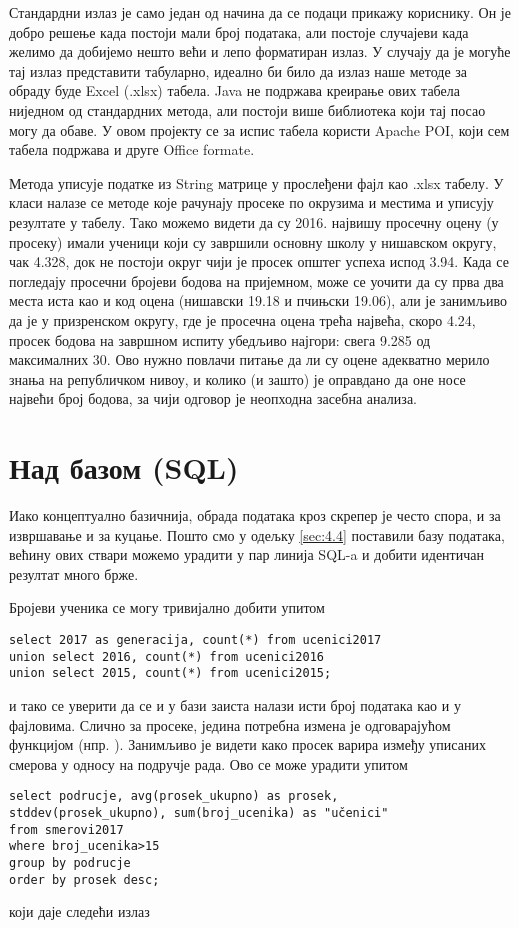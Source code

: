 Стандардни излаз је само један од начина да се подаци прикажу кориснику. Он је добро решење када постоји мали број података, али постоје случајеви када желимо да добијемо нешто већи и лепо форматиран излаз. У случају да је могуће тај излаз представити табуларно, идеално би било да излаз наше методе за обраду буде Excel (.xlsx) табела. Java не подржава креирање ових табела ниједном од стандардних метода, али постоји више библиотека који тај посао могу да обаве. У овом пројекту се за испис табела користи Apache POI, који сем табела подржава и друге Office formate.

Метода  уписује податке из String матрице у прослеђени фајл као .xlsx табелу. У класи  налазе се методе које рачунају просеке по окрузима и местима и уписују резултате у табелу. Тако можемо видети да су 2016. највишу просечну оцену (у просеку) имали ученици који су завршили основну школу у нишавском округу, чак 4.328, док не постоји округ чији је просек општег успеха испод 3.94. Када се погледају просечни бројеви бодова на пријемном, може се уочити да су прва два места иста као и код оцена (нишавски 19.18 и пчињски 19.06), али је занимљиво да је у призренском округу, где је просечна оцена трећа највећа, скоро 4.24, просек бодова на завршном испиту убедљиво најгори: свега 9.285 од максималних 30. Ово нужно повлачи питање да ли су оцене адекватно мерило знања на републичком нивоу, и колико (и зашто) је оправдано да оне носе највећи број бодова, за чији одговор је неопходна засебна анализа.

\section{Над базом (SQL)}

Иако концептуално базичнија, обрада података кроз скрепер је често спора, и за извршавање и за куцање. Пошто смо у одељку \ref{sec:4.4} поставили базу података, већину ових ствари можемо урадити у пар линија SQL-a и добити идентичан резултат много брже.

Бројеви ученика се могу тривијално добити упитом 
\begin{verbatim}
select 2017 as generacija, count(*) from ucenici2017 
union select 2016, count(*) from ucenici2016 
union select 2015, count(*) from ucenici2015;
\end{verbatim} 
и тако се уверити да се и у бази заиста налази исти број података као и у фајловима. Слично за просеке, једина потребна измена је  одговарајућом функцијом (нпр. ). Занимљиво је видети како просек варира између уписаних смерова у односу на подручје рада. Ово се може урадити упитом
\begin{verbatim}
select podrucje, avg(prosek_ukupno) as prosek, 
stddev(prosek_ukupno), sum(broj_ucenika) as "učenici"
from smerovi2017 
where broj_ucenika>15 
group by podrucje 
order by prosek desc;
\end{verbatim}
који даје следећи излаз

